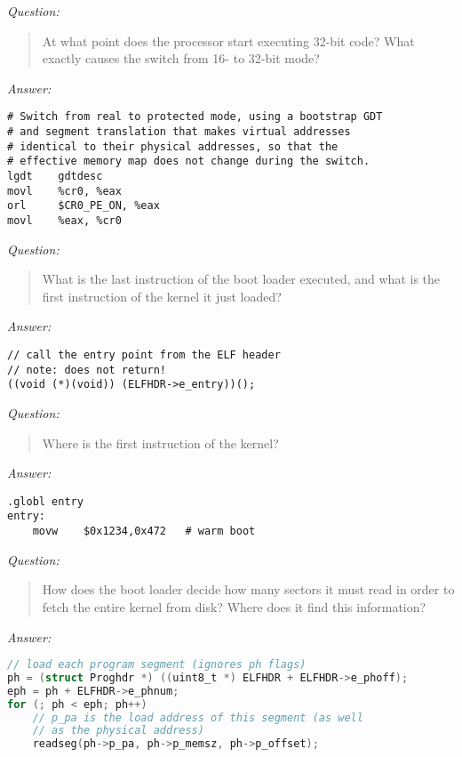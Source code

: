 \documentclass[10pt]{article}
\begin{document}
	\begin{flushleft}	
	\emph{\large{Question:}}
		\begin{quote}
		At what point does the processor start executing 32-bit code? What exactly causes the switch from 16- to 32-bit mode?
		\end{quote}
	\end{flushleft}
	\emph{\large{Answer:}}\newline
\begin{lstlisting}[language={[x86masm]Assembler}]
# Switch from real to protected mode, using a bootstrap GDT
# and segment translation that makes virtual addresses 
# identical to their physical addresses, so that the 
# effective memory map does not change during the switch.
lgdt    gdtdesc
movl    %cr0, %eax
orl     $CR0_PE_ON, %eax
movl    %eax, %cr0
\end{lstlisting}	

	\begin{flushleft}	
	\emph{\large{Question:}}
		\begin{quote}
		What is the last instruction of the boot loader executed, and what is the first instruction of the kernel it just loaded?
		\end{quote}
	\end{flushleft}
	\emph{\large{Answer:}}\newline
\begin{lstlisting}[language={[x86masm]Assembler}]
// call the entry point from the ELF header
// note: does not return!
((void (*)(void)) (ELFHDR->e_entry))();
\end{lstlisting}

	\begin{flushleft}	
	\emph{\large{Question:}}
		\begin{quote}
		Where is the first instruction of the kernel?
		\end{quote}
	\end{flushleft}
	\emph{\large{Answer:}}\newline
\begin{lstlisting}[language={[x86masm]Assembler}]
.globl entry
entry:
	movw	$0x1234,0x472	# warm boot
\end{lstlisting}

	\begin{flushleft}	
	\emph{\large{Question:}}
		\begin{quote}
		How does the boot loader decide how many sectors it must read in order to fetch the entire kernel from disk? Where does it find this information?
		\end{quote}
	\end{flushleft}
	\emph{\large{Answer:}}\newline
\begin{lstlisting}[language=C]
// load each program segment (ignores ph flags)
ph = (struct Proghdr *) ((uint8_t *) ELFHDR + ELFHDR->e_phoff);
eph = ph + ELFHDR->e_phnum;
for (; ph < eph; ph++)
	// p_pa is the load address of this segment (as well
	// as the physical address)
	readseg(ph->p_pa, ph->p_memsz, ph->p_offset);
\end{lstlisting}
\end{document}
